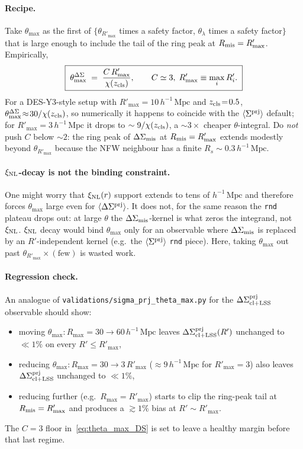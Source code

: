 \documentclass[a4paper, 11pt]{article}
\newcommand{\zcls}{z_{\rm cls}}
\newcommand{\xinl}{\xi_{\rm NL}}
\newcommand{\hMpc}{h^{-1}\,\mathrm{Mpc}}
\newcommand{\Sprj}{\Sigma^{\rm prj}}
\newcommand{\DSmis}{\Delta\Sigma_{\rm mis}}
\newcommand{\DSprj}{\Delta\Sigma^{\rm prj}}
\newcommand{\avg}[1]{\langle #1 \rangle}
\newcommand{\Rmis}{R_{\rm mis}}
\begin{document}
\paragraph{Recipe.}
Take \(\theta_{\max}\) as the first of
\(\{\theta_{R'_{\max}}\) times a safety factor,
\(\theta_\lambda\) times a safety factor\(\}\) that is large
enough to include the tail of the ring peak at
\(\Rmis=R'_{\max}\). Empirically,
\begin{equation}
\boxed{\;
\theta_{\max}^{\Delta\Sigma}
\;=\;
\frac{C\,R'_{\max}}{\chi(\zcls)} ,
\qquad C\simeq 3 ,\;
R'_{\max}\equiv\max_i R'_i .
\;}
\label{eq:theta_max_DS}
\end{equation}
For a DES-Y3-style setup with
\(R'_{\max}\!=\!10\,\hMpc\) and \(\zcls\!=\!0.5\),
\(\theta_{\max}^{\Delta\Sigma}\!\approx\!30/\chi(\zcls)\), so
numerically it happens to coincide with the \(\avg{\Sprj}\)
default; for \(R'_{\max}\!=\!3\,\hMpc\) it drops to
\(\sim 9/\chi(\zcls)\), a \(\sim 3\times\) cheaper
\(\theta\)-integral. Do \emph{not} push \(C\) below \(\sim 2\):
the ring peak of \(\DSmis\) at \(\Rmis=R'_{\max}\) extends
modestly beyond \(\theta_{R'_{\max}}\) because the NFW neighbour
has a finite \(R_s\sim 0.3\,\hMpc\).

\paragraph{\(\xinl\)-decay is not the binding constraint.}
One might worry that \(\xinl(r)\) support extends to tens of
\(\hMpc\) and therefore forces \(\theta_{\max}\) large even for
\(\avg{\DSprj}\). It does not, for the same reason the
\texttt{rnd} plateau drops out: at large \(\theta\) the
\(\DSmis\)-kernel is what zeros the integrand, not \(\xinl\).
\(\xinl\) decay would bind \(\theta_{\max}\) only for an
observable where \(\DSmis\) is replaced by an
\(R'\)-independent kernel (e.g.\ the \(\avg{\Sprj}\) \texttt{rnd}
piece). Here, taking \(\theta_{\max}\) out past
\(\theta_{R'_{\max}}\!\times\!(\text{few})\) is wasted work.

\paragraph{Regression check.}
An analogue of \texttt{validations/sigma\_prj\_theta\_max.py}
for the \(\DSprj_{\rm cl+LSS}\) observable should show:
\begin{itemize}\setlength\itemsep{2pt}
  \item moving \(\theta_{\max}\!:\!R_{\max}=30\!\to\!60\,\hMpc\)
        leaves \(\DSprj_{\rm cl+LSS}(R')\) unchanged to
        \(\ll 1\%\) on every \(R'\!\le\!R'_{\max}\),
  \item reducing \(\theta_{\max}\!:\!R_{\max}=30\!\to\!3\,R'_{\max}\)
        (\(\approx 9\,\hMpc\) for \(R'_{\max}\!=\!3\))
        also leaves \(\DSprj_{\rm cl+LSS}\) unchanged to
        \(\ll 1\%\),
  \item reducing further (e.g.\ \(R_{\max}\!=\!R'_{\max}\))
        starts to clip the ring-peak tail at \(\Rmis=R'_{\max}\)
        and produces a \(\gtrsim 1\%\) bias at
        \(R'\!\sim\!R'_{\max}\).
\end{itemize}
The \(C\!=\!3\) floor in~\eqref{eq:theta_max_DS} is set to leave
a healthy margin before that last regime.
\end{document}
